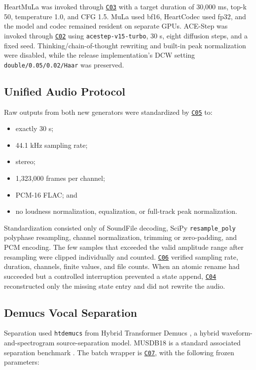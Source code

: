 \documentclass[11pt,a4paper]{article}
\newcommand{\coderef}[1]{\hyperlink{code:#1}{\texttt{#1}}}
\begin{document}
HeartMuLa was invoked through \coderef{C03} with a target duration of 30,000 ms, top-k 50, temperature 1.0, and CFG 1.5. MuLa used bf16, HeartCodec used fp32, and the model and codec remained resident on separate GPUs. ACE-Step was invoked through \coderef{C02} using \texttt{acestep-v15-turbo}, 30 s, eight diffusion steps, and a fixed seed. Thinking/chain-of-thought rewriting and built-in peak normalization were disabled, while the release implementation's DCW setting \texttt{double/0.05/0.02/Haar} was preserved.

\subsection{Unified Audio Protocol}

Raw outputs from both new generators were standardized by \coderef{C05} to:

\begin{itemize}
  \item exactly 30 s;
  \item 44.1 kHz sampling rate;
  \item stereo;
  \item 1,323,000 frames per channel;
  \item PCM-16 FLAC; and
  \item no loudness normalization, equalization, or full-track peak normalization.
\end{itemize}

Standardization consisted only of SoundFile decoding, SciPy \texttt{resample\_poly} polyphase resampling, channel normalization, trimming or zero-padding, and PCM encoding. The few samples that exceeded the valid amplitude range after resampling were clipped individually and counted. \coderef{C06} verified sampling rate, duration, channels, finite values, and file counts. When an atomic rename had succeeded but a controlled interruption prevented a state append, \coderef{C04} reconstructed only the missing state entry and did not rewrite the audio.

\subsection{Demucs Vocal Separation}

Separation used \texttt{htdemucs} from Hybrid Transformer Demucs \citep{demucs2021}, a hybrid waveform-and-spectrogram source-separation model. MUSDB18 is a standard associated separation benchmark \citep{musdb18}. The batch wrapper is \coderef{C07}, with the following frozen parameters:
\end{document}
